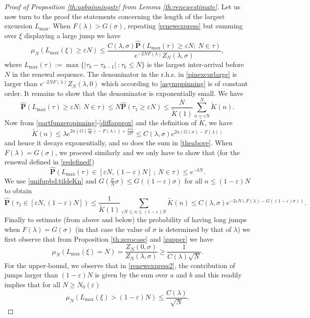 \documentclass[reqno,11pt]{amsart}
\numberwithin{equation}{section}
\newcommand{\gep}{\varepsilon}       %
\newcommand{\gl}{\lambda}
\newcommand{\gs}{\sigma}
\newcommand{\bP}{{\ensuremath{\mathbf P}} }
\renewcommand{\tilde}{\widetilde}
\renewcommand{\hat}{\widehat}
\begin{document}
\begin{proof}[Proof of Proposition \ref{th:upbpinningstr} from Lemma \ref{th:renewestimate}]
 Let us now turn to the proof the statements concerning the length of the largest excursion $L_{\max}$. 
When $F(\gl)>G(\gs)$, repeating \eqref{renewexpress} but summing over $\xi$ displaying a large jump we have
\begin{equation}\label{pinexcurlarge}
  \mu_N ( L_{\max}(\xi)\ge  \gep N)\le \frac{ C(\gl,\sigma)  \hat \bP (L_{\max}(\tau)\ge \gep N ; \ N \in \tau)}{ e^{-2N F(\gl)}Z_N(\gl,\sigma)},
\end{equation}
where $L_{\max}(\tau):=\max\{ |\tau_{k}-\tau_{k-1}| \ : \tau_k \le N \}$ is the largest inter-arrival before $N$ in the renewal sequence.
The denominator in the r.h.s. in \eqref{pinexcurlarge} is larger than 
$e^{-2N F(\gl)}Z_N(\gl,0)$ which according to \eqref{asymppinning} is of constant order.
It remains to show that the denominator is exponentially small.
We have
\begin{equation}\label{theabove}
 \hat \bP (L_{\max}(\tau)\ge \gep N ; \ N \in \tau)\le  N \hat \bP(\tau_1\ge \gep N) \le \frac{N}{\tilde K(1)}  \sum_{n = \gep N}^N \tilde K(n) .
\end{equation}
Now from \eqref{partfunzeropinning}-\eqref{diffapprox} and the definition of $\tilde K$, we have
\begin{equation}\label{unifupbd:tildeKn}
 \tilde K(n) \le  \gl e^{2n \left( G(\frac{\sigma n }{N})-F(\gl)\right)+ \frac{\sigma^2 n}{4 N^2}}\le C(\gl,\sigma)  e^{2n \left( G(\sigma)-F(\gl)\right)}
 \end{equation}
and hence it decays exponentially, and so does the sum in \eqref{theabove}.
 When $F(\gl)=G(\gs)$, we proceed similarly and we only have to show that (for the renewal defined in \eqref{redefined})
 \begin{equation}
  \hat \bP (L_{\max}(\tau)\in [ \gep N, (1-\gep)N] \ ; \ N \in \tau)\le e^{-\delta N}.
 \end{equation} 
 We use \eqref{unifupbd:tildeKn} and $G(\frac{n}{N}\gs)\le G((1-\gep)\gs)$ for all $n \le (1-\gep)N$ to obtain
 \begin{equation}\label{unionbdtie}
\hat \bP ( \tau_1  \in [ \gep N, (1-\gep)N] )\le \frac{1}{\tilde K(1)}  \sum_{\gep N \le n \le (1-\gep)N} \tilde K(n) \le C(\gl, \gs) e^{- 2\gep N (F(\gl)-G((1-\gep)\gs))}.
\end{equation} 
Finally to estimate (from above and below) the probability of having long jumps when $F(\gl)=G(\gs)$ (in that case the value of $\sigma$ is determined by that of $\gl$) we first observe that from Proposition   \ref{th:zerocase} and \eqref{zupper} we have
$$\mu_N (  L_{\max}(\xi)= N)  = \frac{Z_N(0, \gs)}{Z_N(\gl,\gs)}\ge \frac{1}{C(\gl) \sqrt{N}}.$$
For the upper-bound, we observe that in \eqref{renewexpress2}, the contribution of jumps larger than $(1-\gep)N$ is given by the sum over $a$ and $b$ and this readily implies that for all $N \ge N_0(\gep)$
\begin{equation}\label{tieupprob:largexcur}
\mu_N (L_{\max}(\xi) > (1-\gep)N) \leq  \frac{C(\gl)}{\sqrt{N}}.
 \end{equation}

 
\end{proof}
\end{document}
